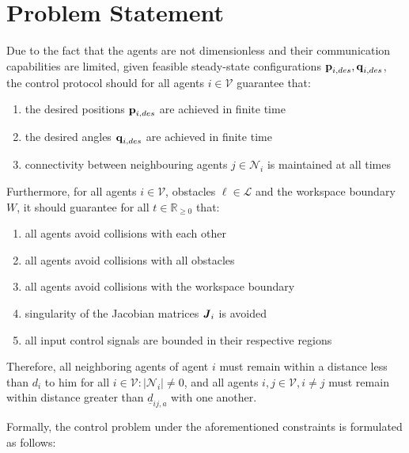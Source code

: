 \section{Problem Statement}
\label{sec:problem_statement}

Due to the fact that the agents are not dimensionless and their communication
capabilities are limited, given feasible steady-state configurations
$\bm{\mathbf{p}}_{i,des}, \bm{\mathbf{q}}_{i,des}$, the control protocol should for all
agents $i \in \mathcal{V}$ guarantee that:
\begin{enumerate}
  \item the desired positions $\bm{\mathbf{p}}_{i,des}$ are achieved in finite time
  \item the desired angles $\bm{\mathbf{q}}_{i,des}$ are achieved in finite time
  \item connectivity between neighbouring agents $j \in \mathcal{N}_i$ is
    maintained at all times
\end{enumerate}
Furthermore, for all agents $i \in \mathcal{V}$, obstacles $\ell \in \mathcal{L}$
and the workspace boundary $W$, it should guarantee for all
$t\in\mathbb{R}_{\geq 0}$ that:
\begin{enumerate}
  \item all agents avoid collisions with each other
  \item all agents avoid collisions with all obstacles
  \item all agents avoid collisions with the workspace boundary
  \item singularity of the Jacobian matrices $\bm{\mathit{J}}_i$ is avoided
  \item all input control signals are bounded in their respective regions
\end{enumerate}

Therefore, all neighboring agents of agent $i$ must remain within a distance
less than $d_i$ to him for all $i \in \mathcal{V}: |\mathcal{N}_i| \not= 0$,
and all agents $i, j\in \mathcal{V}, i \neq j$ must remain within distance
greater than $\underline{d}_{ij,a}$ with one another.

Formally, the control problem under the aforementioned constraints is
formulated as follows:\\

